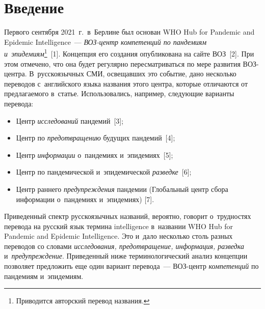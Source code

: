 

\vspace*{-1pt}



\thispagestyle{headings}

\begin{multicols}{2}

\label{st\stat}

\section{Введение}

Первого сентября 2021~г.\ в~Берлине был основан WHO Hub for Pandemic and Epidemic 
Intelligence~--- \textit{ВОЗ-центр компетенций по пандемиям 
и~эпидемиям}\footnote[2]{Приводится авторский перевод названия.}~[1]. Концепция его 
создания опубликована на сайте ВОЗ~[2]. При этом отмечено, что она будет 
регулярно пересматриваться по мере развития ВОЗ-центра. В~русскоязычных 
СМИ, освещавших это событие, дано несколько переводов с~английского языка 
названия этого центра, которые отличаются от предлагаемого в~статье. 
Использовались, например, следующие варианты перевода:
\begin{itemize}
\item Центр \textit{исследований} пандемий~[3];
\item Центр по \textit{предотвращению} будущих пандемий~[4];
\item Центр \textit{информации} о~пандемиях и~эпидемиях~[5];
\item Центр по пандемической и~эпидемической \textit{разведке}~[6];
\item Центр раннего \textit{предупреждения} пандемии (Глобальный центр сбора 
информации о~пандемиях и~эпидемиях) [7].
\end{itemize}

Приведенный спектр русскоязычных названий, вероятно, говорит о~трудностях 
перевода на русский язык термина intelligence в~названии WHO Hub for Pandemic 
and Epidemic Intelligence. Это и~дало несколько столь разных переводов со 
словами \textit{исследования, предотвращение, информация, разведка} 
и~\textit{предупреждение}. Приведенный ниже терминологический анализ 
концепции позволяет предложить еще один вариант перевода~--- ВОЗ-центр 
\textit{компетенций} по пандемиям и~эпидемиям.


\end{multicols}
